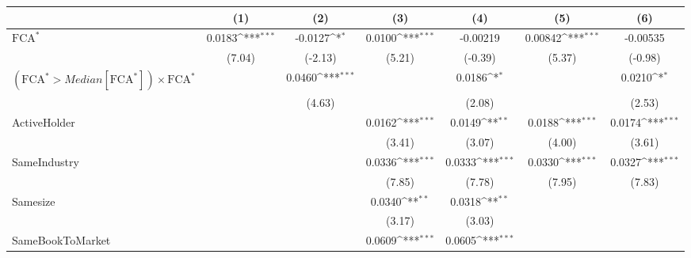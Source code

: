 {
\def\sym#1{\ifmmode^{#1}\else\(^{#1}\)\fi}
\begin{tabular}{l*{6}{c}}
\hline\hline
                    &\multicolumn{1}{c}{(1)}         &\multicolumn{1}{c}{(2)}         &\multicolumn{1}{c}{(3)}         &\multicolumn{1}{c}{(4)}         &\multicolumn{1}{c}{(5)}         &\multicolumn{1}{c}{(6)}         \\
\hline
$ \text{FCA}^* $    &      0.0183\sym{***}&     -0.0127\sym{*}  &      0.0100\sym{***}&    -0.00219         &     0.00842\sym{***}&    -0.00535         \\
                    &      (7.04)         &     (-2.13)         &      (5.21)         &     (-0.39)         &      (5.37)         &     (-0.98)         \\
[1em]
 $ (\text{FCA}^* > Median[\text{FCA}^*]) \times {\text{FCA} ^*}  $ &                     &      0.0460\sym{***}&                     &      0.0186\sym{*}  &                     &      0.0210\sym{*}  \\
                    &                     &      (4.63)         &                     &      (2.08)         &                     &      (2.53)         \\
[1em]
ActiveHolder        &                     &                     &      0.0162\sym{***}&      0.0149\sym{**} &      0.0188\sym{***}&      0.0174\sym{***}\\
                    &                     &                     &      (3.41)         &      (3.07)         &      (4.00)         &      (3.61)         \\
[1em]
SameIndustry        &                     &                     &      0.0336\sym{***}&      0.0333\sym{***}&      0.0330\sym{***}&      0.0327\sym{***}\\
                    &                     &                     &      (7.85)         &      (7.78)         &      (7.95)         &      (7.83)         \\
[1em]
Samesize            &                     &                     &      0.0340\sym{**} &      0.0318\sym{**} &                     &                     \\
                    &                     &                     &      (3.17)         &      (3.03)         &                     &                     \\
[1em]
SameBookToMarket    &                     &                     &      0.0609\sym{***}&      0.0605\sym{***}&                     &                     \\

\end{tabular}}
